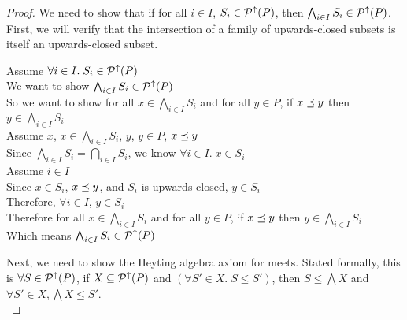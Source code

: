 \begin{proof}
We need to show that if for all $i \in I$, $S_i \in \mathcal{P}^{\uparrow}({P})$, 
then $\bigwedge_{i \in I} S_i \in \mathcal{P}^{\uparrow}({P})$. First, we will verify that 
the intersection of a family of upwards-closed subsets is itself an
upwards-closed subset. 

\begin{tabbedproof}
\oo Assume $\forall i \in I.\; S_i \in \mathcal{P}^{\uparrow}({P})$ \\
\ooo We want to show $\bigwedge_{i \in I} S_i \in \mathcal{P}^{\uparrow}({P})$ \\ 
\ooo So we want to show for all $x \in \bigwedge_{i \in I} S_i$ and for all $y \in P$, if $x \preceq y$ then $y \in \bigwedge_{i \in I} S_i$ \\
\ooo Assume $x$, $x \in \bigwedge_{i \in I} S_i$, $y$, $y \in P$, $x \preceq y$ \\
\oooo Since $\bigwedge_{i \in I} S_i = \bigcap_{i \in I} S_i$, we know 
      $\forall i \in I.\; x \in S_i$ \\
\oooo Assume $i \in I$ \\
\ooooo Since $x \in S_i$, $x \preceq y$, and $S_i$ is upwards-closed, $y \in S_i$ \\
\oooo Therefore, $\forall i \in I$, $y \in S_i$ \\
\ooo Therefore for all $x \in \bigwedge_{i \in I} S_i$ and for all $y \in P$, if $x \preceq y$ then $y \in \bigwedge_{i \in I} S_i$ \\
\ooo Which means $\bigwedge_{i \in I} S_i \in \mathcal{P}^{\uparrow}({P})$ \\ 
\end{tabbedproof}

\noindent Next, we need to show the Heyting algebra axiom for meets. 
Stated formally,
this is $\forall S \in \mathcal{P}^{\uparrow}({P})$, if $X \subseteq
\mathcal{P}^{\uparrow}({P})$ and $(\forall S' \in X.\; S \leq S')$, then $S
\leq \bigwedge X$ and $\forall S' \in X, \bigwedge X \leq S'$.
\\


\end{proof}

